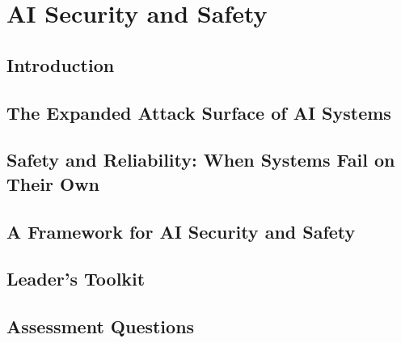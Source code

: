 \chapter{AI Security and Safety}
\label{chap:ai_security_and_safety}

\section{Introduction}
\label{sec:security_introduction}

\section{The Expanded Attack Surface of AI Systems}
\label{sec:attack_surface}

\section{Safety and Reliability: When Systems Fail on Their Own}
\label{sec:safety_and_reliability}

\section{A Framework for AI Security and Safety}
\label{sec:security_framework}

\section{Leader's Toolkit}
\label{sec:security_leaders_toolkit}

\section{Assessment Questions}
\label{sec:security_assessment_questions}